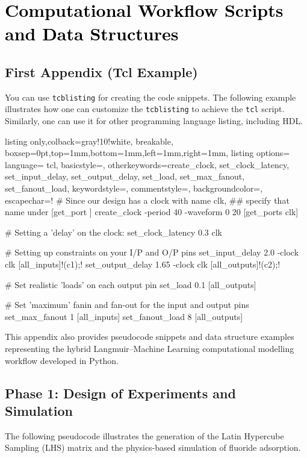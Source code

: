 \chapter{\textcolor{black}{Computational Workflow Scripts and Data Structures}}

\section{First Appendix (Tcl Example)}
You can use \texttt{tcblisting} for creating the code snippets. The following example illustrates how one can customize the \texttt{tcblisting} to achieve the \texttt{tcl} script. Similarly, one can use it for other programming language listing, including HDL.

\begin{tcblisting}{listing only,colback=gray!10!white, breakable, boxsep=0pt,top=1mm,bottom=1mm,left=1mm,right=1mm,
listing options={
language= tcl,
basicstyle=\small\ttfamily, 
otherkeywords={create_clock, set_clock_latency, set_input_delay, set_output_delay, set_load, set_max_fanout, set_fanout_load},
keywordstyle=\color{blue}, 
commentstyle=\color{gray},
backgroundcolor=\color{gray!25},
escapechar=!}}
# Since our design has a clock with name clk, 
## specify that name under [get_port ]
create_clock -period 40 -waveform {0 20} [get_ports clk]

# Setting a 'delay' on the clock:
set_clock_latency 0.3 clk

# Setting up constraints on your I/P and O/P pins
set_input_delay 2.0 -clock clk [all_inputs]!\node[](c1){};!
set_output_delay 1.65 -clock clk [all_outputs]!\node[](c2){};!

# Set realistic 'loads' on each output pin
set_load 0.1 [all_outputs]

# Set 'maximum' fanin and fan-out for the input and output pins 
set_max_fanout 1 [all_inputs]
set_fanout_load 8 [all_outputs]      
\end{tcblisting}

This appendix also provides pseudocode snippets and data structure examples representing the hybrid Langmuir--Machine Learning computational modelling workflow developed in Python.

\section{Phase 1: Design of Experiments and Simulation}
The following pseudocode illustrates the generation of the Latin Hypercube Sampling (LHS) matrix and the physics-based simulation of fluoride adsorption.

